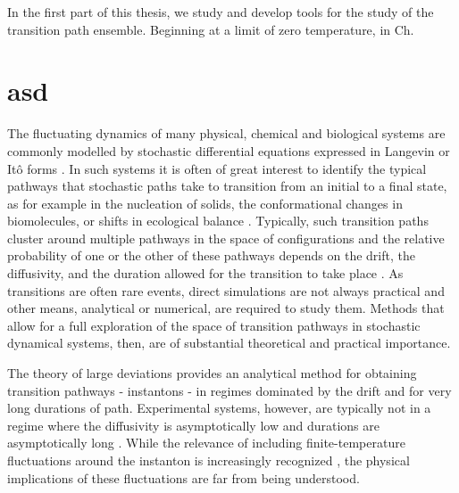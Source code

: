 \documentclass[withindex,glossary,techreport]{cam-thesis}
\begin{document}
In the first part of this thesis, we study and develop tools for the study of the transition path ensemble. Beginning at a limit of zero temperature, in Ch.

\section*{asd}



The fluctuating dynamics of many physical, chemical and biological
systems are commonly modelled by stochastic differential equations
expressed in Langevin or Itô forms \citep{kampenStochasticProcessesPhysics2011,gardinerStochasticMethodsHandbook2010,riskenFokkerPlanckEquationMethods2012,bharucha-reidElementsTheoryMarkov2012}.
In such systems it is often of great interest to identify the typical
pathways that stochastic paths take to transition from an initial
to a final state, as for example in the nucleation of solids, the
conformational changes in biomolecules, or shifts in ecological balance
\citep{faccioliDominantPathwaysProtein2006, demarcoPhaseTransitionModel2001, gardnerConstructionGeneticToggle2000, mangelBarrierTransitionsDriven1994, wolynesNavigatingFoldingRoutes1995, huangMolecularMathematicalBasis2012, paninskiMostLikelyVoltage2006, noltingBallsCupsQuasipotentials2016, leeFindingMultipleReaction2017}.
Typically, such transition paths cluster around multiple pathways
in the space of configurations and the relative probability of one
or the other of these pathways depends on the drift, the diffusivity,
and the duration allowed for the transition to take place \citep{onsagerFluctuationsIrreversibleProcesses1953,bachFunctionalsPathsDiffusion1977,itoProbabilisticConstructionLagrangean1978,ikedaStochasticDifferentialEquations2014}.
As transitions are often rare events, direct simulations are not always
practical and other means, analytical or numerical, are required to
study them. Methods that allow for a full exploration of the space
of transition pathways in stochastic dynamical systems, then, are
of substantial theoretical and practical importance.

The theory of large deviations \citep{ventselSMALLRANDOMPERTURBATIONS1970,stratonovichMarkovMethodsTheory1989,grahamMacroscopicPotentialsBifurcations1989,arnoldStochasticDifferentialEquations1974}
provides an analytical method for obtaining transition pathways -
instantons - in regimes dominated by the drift and for very long durations
of path. Experimental systems, however, are typically not in a regime
where the diffusivity is asymptotically low and durations are asymptotically
long \citep{gladrowExperimentalMeasurementRelative2021}. While the
relevance of including finite-temperature fluctuations around the
instanton \citep{gelfandIntegrationFunctionalSpaces1960} is increasingly
recognized \citep{nickelsen_noise_2022,corazza_normalized_2020,lu_gaussian_2017},
the physical implications of these fluctuations are far from being
understood.
\end{document}
